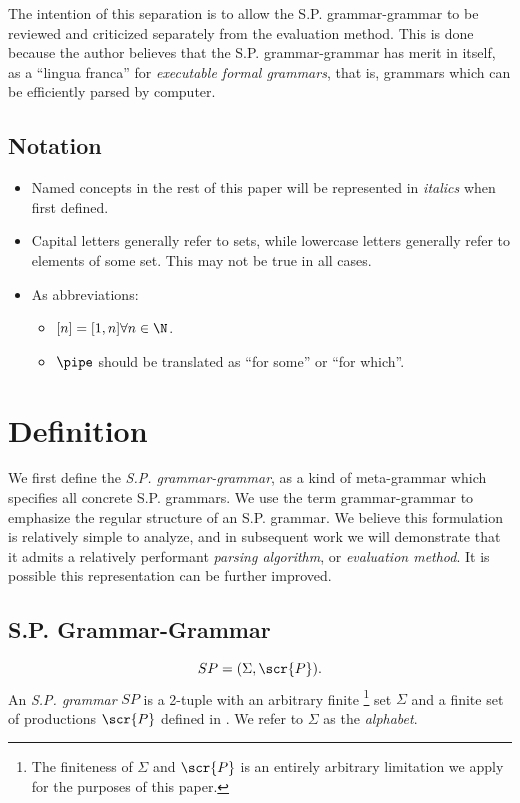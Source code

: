 \documentclass[10pt]{article}
\begin{document}
The intention of this separation is to allow the S.P. grammar-grammar to be reviewed and criticized separately from the evaluation method. This is done because the author believes that the S.P. grammar-grammar has merit in itself, as a ``lingua franca'' for \textit{executable formal grammars}, that is, grammars which can be efficiently parsed by computer.

\subsection{Notation}
\label{sec:notation}
\begin{itemize}
  \item Named concepts in the rest of this paper will be represented in \textit{italics} when first defined.
  \item Capital letters generally refer to sets, while lowercase letters generally refer to elements of some set. This may not be true in all cases.
  \item As abbreviations: \begin{itemize}
    \item $[n] = [1, n] \forall n \in \N$.
    \item $\pipe$ should be translated as ``for some'' or ``for which''.
  \end{itemize}
\end{itemize}

\section{Definition}
\label{sec:definition}
We first define the \textit{S.P. grammar-grammar}, as a kind of meta-grammar which specifies all concrete S.P. grammars. We use the term grammar-grammar to emphasize the regular structure of an S.P. grammar. We believe this formulation is relatively simple to analyze, and in subsequent work we will demonstrate that it admits a relatively performant \textit{parsing algorithm}, or \textit{evaluation method}. It is possible this representation can be further improved.

\subsection{S.P. Grammar-Grammar}
\label{sec:grammar-grammar}
\begin{equation}
  \label{eq:sp}
  SP = (\Sigma, \scr{P}).
\end{equation}
An \textit{S.P. grammar} $SP$ is a 2-tuple with an arbitrary finite \footnote{The finiteness of $\Sigma$ and $\scr{P}$ is an entirely arbitrary limitation we apply for the purposes of this paper.} set $\Sigma$ and a finite set of productions $\scr{P}$ defined in . We refer to $\Sigma$ as the \textit{alphabet}.
\end{document}

